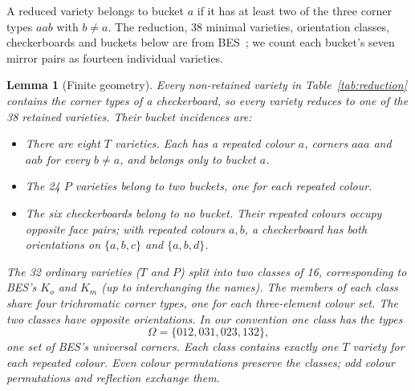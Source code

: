 \documentclass[11pt]{article}
\newtheorem{lemma}{Lemma}
\theoremstyle{remark}
\begin{document}
A reduced variety belongs to bucket $a$ if it has
at least two of the three corner types $aab$ with $b\ne a$.
The reduction, 38 minimal varieties, orientation classes, checkerboards
and buckets below are from BES~\cite[Section 2, Table 8 and Definition 3]{BES};
we count each bucket's seven mirror pairs as fourteen individual varieties.

\begin{lemma}[Finite geometry]\label{lem:geometry}
Every non-retained variety in Table~\ref{tab:reduction} contains the corner
types of a checkerboard, so every variety reduces to one of the 38 retained
varieties. Their bucket incidences are:
\begin{itemize}
\item There are eight $T$ varieties. Each has a repeated colour $a$, corners
  $aaa$ and $aab$ for every $b\ne a$, and belongs only to bucket $a$.
\item The 24 $P$ varieties belong to two buckets, one for each repeated
  colour.
\item The six checkerboards belong to no bucket. Their repeated colours
  occupy opposite face pairs; with repeated colours $a,b$, a checkerboard
  has both orientations on $\{a,b,c\}$ and $\{a,b,d\}$.
\end{itemize}
The 32 ordinary varieties ($T$ and $P$) split into two classes of 16,
corresponding to BES's $K_o$ and $K_m$ (up to interchanging the names).
The members of each class share four trichromatic corner types, one for
each three-element colour set. The two classes have opposite orientations.
In our convention one class has the types
\[
\Omega=\{012,031,023,132\},
\]
one set of BES's \emph{universal corners}.
Each class contains exactly one $T$ variety for each repeated colour.
Even colour permutations preserve the classes; odd colour permutations and
reflection exchange them.
\end{lemma}
\end{document}

